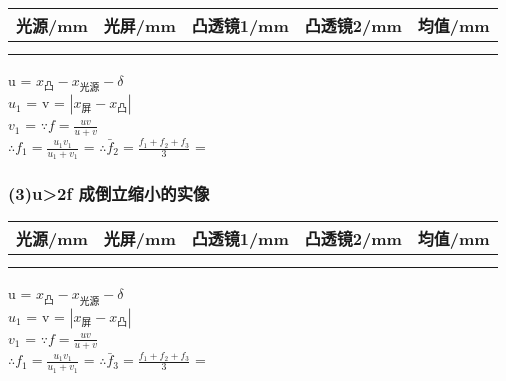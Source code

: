 \begin{center}

\begin{tabular}{|c|c|c|c|c|}
\hline 
光源/mm & 光屏/mm & 凸透镜1/mm & 凸透镜2/mm & 均值/mm \\ 
\hline 
{%
{%
{%
{%
	& %
{%
{%
\\
\hline
{%
\end{tabular}
\vspace{10pt}
\end{center}
u = ${x}_{\text{凸}} - {x}_{\text{光源}} - {\delta}$\\
${u}_1$ = %
v = $\left | {x}_{\text{屏}} - {x}_{\text{凸}} \right |$\\
${v}_1$ = %
$\because f = \frac{uv}{u+v}$\\
$\therefore {f}_1 = \frac{{u}_1{v}_1}{{u}_1+{v}_1}$ = %
$\therefore {\bar{f}}_2 = \frac{{f}_1+{f}_2+{f}_3}{3}$ = %

\subsubsection*{(3)u>2f 成倒立缩小的实像}

\begin{center}

\begin{tabular}{|c|c|c|c|c|}
\hline 
光源/mm & 光屏/mm & 凸透镜1/mm & 凸透镜2/mm & 均值/mm \\ 
\hline 
{%
{%
{%
{%
	& %
{%
{%
\\
\hline
{%
\end{tabular}
\vspace{10pt}
\end{center}
u = ${x}_{\text{凸}} - {x}_{\text{光源}} - {\delta}$\\
${u}_1$ = %
v = $\left | {x}_{\text{屏}} - {x}_{\text{凸}} \right |$\\
${v}_1$ = %
$\because f = \frac{uv}{u+v}$\\
$\therefore {f}_1 = \frac{{u}_1{v}_1}{{u}_1+{v}_1}$ = %
$\therefore {\bar{f}}_3 = \frac{{f}_1+{f}_2+{f}_3}{3}$ = %